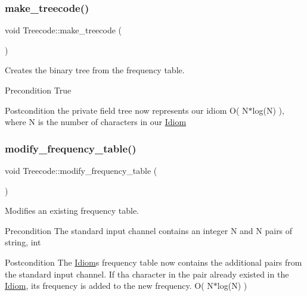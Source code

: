 \subsubsection{\texorpdfstring{make\+\_\+treecode()}{make\_treecode()}}
{\footnotesize\ttfamily void Treecode\+::make\+\_\+treecode (\begin{DoxyParamCaption}{ }\end{DoxyParamCaption})}



Creates the binary tree from the frequency table. 

\begin{DoxyPrecond}{Precondition}
True 
\end{DoxyPrecond}
\begin{DoxyPostcond}{Postcondition}
the private field tree now represents our idiom  O( N$\ast$log(\+N) ), where N is the number of characters in our \hyperlink{classIdiom}{Idiom} 
\end{DoxyPostcond}
\mbox{\label{classTreecode_a24cda3e081573d54fb3c51ec0135f653}} 
\subsubsection{\texorpdfstring{modify\+\_\+frequency\+\_\+table()}{modify\_frequency\_table()}}
{\footnotesize\ttfamily void Treecode\+::modify\+\_\+frequency\+\_\+table (\begin{DoxyParamCaption}{ }\end{DoxyParamCaption})}



Modifies an existing frequency table. 

\begin{DoxyPrecond}{Precondition}
The standard input channel contains an integer N and N pairs of string, int 
\end{DoxyPrecond}
\begin{DoxyPostcond}{Postcondition}
The \hyperlink{classIdiom}{Idiom}\textquotesingle{}s frequency table now contains the additional pairs from the standard input channel. If tha character in the pair already existed in the \hyperlink{classIdiom}{Idiom}, its frequency is added to the new frequency.  O( N$\ast$log(\+N) ) 
\end{DoxyPostcond}
\mbox{\label{classTreecode_a2333bf6b33a3047d8dde155c70e93683}} 
